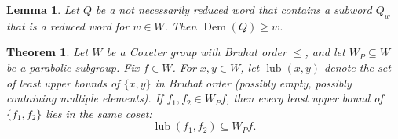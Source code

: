 \documentclass[10pt,a4paper]{amsart}
\newtheorem{theorem}{Theorem}
\newtheorem{lemma}{Lemma}
\newcommand{\dem}{\operatorname{Dem}}
\newcommand{\lub}{\operatorname{lub}}
\begin{document}
\begin{lemma}
\label{lem:dem}
    Let $Q$ be a not necessarily reduced word that contains a subword $Q_w$ that is a reduced word for $w\in W$. Then $\dem(Q)\ge w$.
\end{lemma}

\begin{theorem}\label{thm:lub}
Let \(W\) be a Coxeter group with Bruhat order \(\le\), and let \(W_P\subseteq W\) be a parabolic subgroup.
Fix \(f\in W\). For \(x,y\in W\), let \(\lub(x,y)\) denote the set of \emph{least} upper bounds of \(\{x,y\}\)
in Bruhat order (possibly empty, possibly containing multiple elements).
If \(f_1,f_2\in W_P f\), then every least upper bound of \(\{f_1,f_2\}\) lies in the same coset:
\[
\lub(f_1,f_2)\subseteq W_P f.
\]
\end{theorem}
\end{document}
